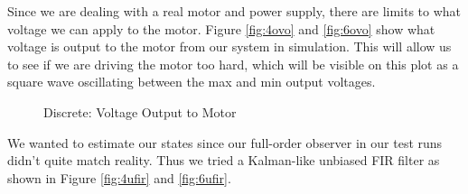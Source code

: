 \documentclass{article}
\begin{document}
Since we are dealing with a real motor and power supply, there are limits to what voltage we can apply to the motor. Figure \ref{fig:4ovo} and \ref{fig:6ovo} show what voltage is output to the motor from our system in simulation. This will allow us to see if we are driving the motor too hard, which will be visible on this plot as a square wave oscillating between the max and min output voltages.

\begin{figure}
\centering
{}
\caption{Discrete: Voltage Output to Motor}
\end{figure}

We wanted to estimate our states since our full-order observer in our test runs didn't quite match reality. Thus we tried a Kalman-like unbiased FIR filter as shown in Figure 	\ref{fig:4ufir} and \ref{fig:6ufir}.
\end{document}
